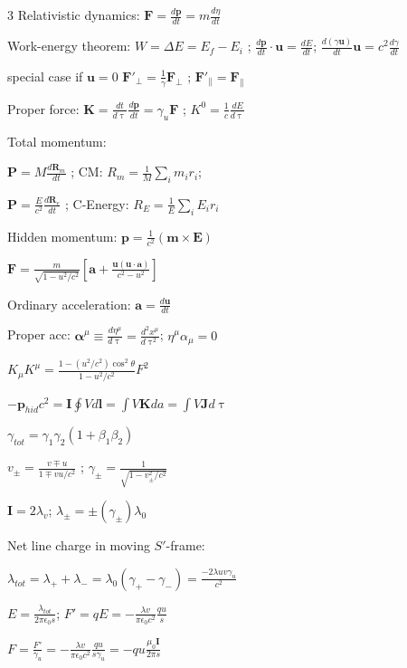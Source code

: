 \documentclass[a4paper,twoside]{article}
\begin{document}
\begin{multicols*}{3}
Relativistic dynamics:
\(\bm F = \frac{d\bm p}{dt} = m \frac{d\eta}{dt}\)

Work-energy theorem:
\(W = \Delta E = E_f - E_i\) ; \(\frac{d\bm p}{dt} \cdot \bm u = \frac{dE}{dt}\);
\(\frac{d(\gamma \bm u)}{dt}\bm u = c^2\frac{d\gamma}{dt}\)

special case if \(\bm u = 0\) 
\(\bm F'_{\perp} = \frac{1}{\gamma} \bm F_{\perp}\) ; \(\bm F'_{\parallel} = \bm F_{\parallel}\)

Proper force:
\(\bm K = \frac{dt}{d\uptau} \frac{d\bm p}{dt} = \gamma_u \bm F\) ; \(K^0 = \frac{1}{c} \frac{dE}{d\uptau}\)

Total momentum:

\(\bm P = M \frac{d \bm R_m}{dt}\) ; CM: \(R_m = \frac{1}{M} \sum_i m_i r_i\);

\(\bm P = \frac{E}{c^2} \frac{d\bm R_e}{dt}\) ;  C-Energy: \(R_E = \frac{1}{E} \sum_i E_i r_i\)

Hidden momentum:
\(\bm p = \frac{1}{c^2} (\bm m\times \bm E )\)

\(\bm F = \frac{m}{\sqrt{1-u^2/c^2}}[\bm a + \frac{\bm u (\bm u \cdot \bm a)}{c^2-u^2}]\)

Ordinary acceleration:
\(\bm a = \frac{d\bm u}{dt}\)

Proper acc:
\(\bm \alpha^\mu \equiv \frac{d\eta^\mu}{d \uptau} = \frac{d^2 x^\mu}{d \uptau^2}\);
\(\eta^\mu \alpha_\mu = 0\)

\(K_\mu K^\mu = \frac{1 - (u^2/c^2) \cos^2 \theta}{1 - u^2/c^2} F^2 \)

\(-\bm p_{hid} c^2 = \bm I \oint V d\bm l = \int V \bm K da =  \int V \bm J d\uptau\)


\(\gamma_{tot} = \gamma_1 \gamma_2 (1 + \beta_1 \beta_2)\)

\(v_\pm = \frac{v \mp u}{1 \mp vu/c^2}\) ; \(\gamma_\pm = \frac{1}{\sqrt{1 - v_\pm^2/c^2}}\)

\(\bm I = 2 \lambda_v \); \(\lambda_\pm = \pm (\gamma_\pm) \lambda_0\)


Net line charge in moving \(S'\)-frame:

\(\lambda_{tot} = \lambda_+ + \lambda_- = \lambda_0 (\gamma_+ - \gamma_-) = \frac{-2 \lambda uv\gamma_u}{c^2}\)

\(E = \frac{\lambda_{tot}}{2 \pi \epsilon_0 s}\);
\(F' = qE = - \frac{\lambda v}{\pi \epsilon_0 c^2} \frac{qu}{s}\)

\(F = \frac{F'}{\gamma_u} = - \frac{\lambda v}{\pi \epsilon_0 c^2} \frac{qu}{s \gamma_u} = -qu \frac{\mu_0 \bm I}{2 \pi s}\)




\end{multicols*}
\end{document}
